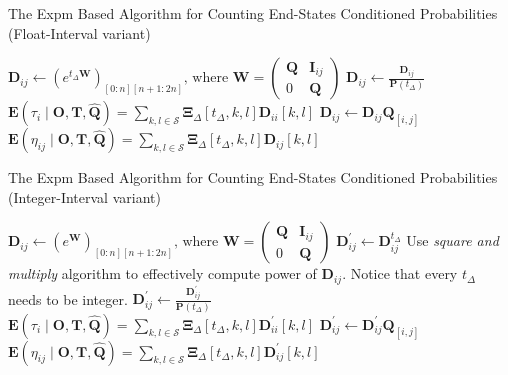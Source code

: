 \documentclass[thesis=M,english]{FITthesis}[2012/10/20]
\newcommand{\matr}[1]{\mathbf{#1}}
\begin{document}
\begin{algorithm}[h]
\caption{The Expm Based Algorithm for Counting End-States Conditioned Probabilities (Float-Interval variant)}\label{fv}
\begin{algorithmic}[1]
\ForAll{$t_{\Delta} \in \matr{T}_{\Delta}$}
	\State $\matr{D}_{ij} \gets (e^{t_{\Delta} \matr{W}})_{[0:n][n+1:2n]}\text{, where } \matr{W} = \begin{pmatrix} \matr{Q} & \matr{I}_{ij} \\ 0 & \matr{Q} \end{pmatrix} $
	\State $\matr{D}_{ij} \gets \frac{ \matr{D}_{ij} }{\matr{P}({t_{\Delta}})}$ 
	 \State $\mathbf{E}(\tau_{i} \mid \matr{O}, \matr{T}, \matr{ \hat Q }) = \sum_{k,l \in \mathcal{S}} \matr{\Xi}_{\Delta}[t_{\Delta},k,l] \matr{D}_{ii}[k,l]$  
	\Else 
	 \State $\matr{D}_{ij} \gets  \matr{D}_{ij} \matr{Q}_{[i,j]}$
	 \State $\mathbf{E}(\eta_{ij} \mid \matr{O}, \matr{T}, \matr{ \hat Q } ) = \sum_{k,l \in \mathcal{S}} \matr{\Xi}_{\Delta}[t_{\Delta},k,l] \matr{D}_{ij}[k,l]$ 
  	\EndIf 
 
 \EndFor
\EndFor
\EndProcedure
\end{algorithmic}
\end{algorithm}

\begin{algorithm}[h]
\caption{The Expm Based Algorithm for Counting End-States Conditioned Probabilities (Integer-Interval variant)}\label{iv}
\begin{algorithmic}[1]
	\State $\matr{D}_{ij} \gets (e^{\matr{W}})_{[0:n][n+1:2n]}\text{, where } \matr{W} = \begin{pmatrix} \matr{Q} & \matr{I}_{ij} \\ 0 & \matr{Q} \end{pmatrix} $
 \EndFor
\ForAll{$t_{\Delta} \in \matr{T}_{\Delta}$}
    \State $\matr{D}_{ij}^{'} \gets  \matr{D}_{ij}^{t_{\Delta}} $
    \Comment Use \textit{square and multiply} algorithm to effectively compute	power of $\matr{D}_{ij}$. Notice that every $t_{\Delta}$ needs to be integer.
	\State $\matr{D}_{ij}^{'} \gets \frac{ \matr{D}_{ij}^{'} }{\matr{P}({t_{\Delta}})}$ 
	 \State $\mathbf{E}(\tau_{i} \mid \matr{O}, \matr{T}, \matr{ \hat Q }) = \sum_{k,l \in \mathcal{S}} \matr{\Xi}_{\Delta}[t_{\Delta},k,l] \matr{D}_{ii}^{'}[k,l]$  
	\Else 
	 \State $\matr{D}^{'}_{ij} \gets  \matr{D}_{ij}^{'} \matr{Q}_{[i,j]}$
	 \State $\mathbf{E}(\eta_{ij} \mid \matr{O}, \matr{T}, \matr{ \hat Q } ) = \sum_{k,l \in \mathcal{S}} \matr{\Xi}_{\Delta}[t_{\Delta},k,l] \matr{D}^{'}_{ij}[k,l]$ 
  	\EndIf 
  \EndFor
\EndFor
\EndProcedure
\end{algorithmic}
\end{algorithm}
\end{document}
